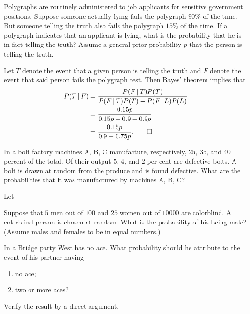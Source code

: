 \begin{problem}
   Polygraphs are routinely administered to job
  applicants for sensitive government positions. Suppose someone actually
  lying fails the polygraph \(90\%\) of the time. But someone telling the
  truth also fails the polygraph \(15\%\) of the time. If a polygraph
  indicates that an applicant is lying, what is the probability that he is
  in fact telling the truth? Assume a general prior probability \(p\) that
  the person is telling the truth.
\end{problem}
\begin{solution*}
  Let \(T\) denote the event that a given person is telling the truth and
  \(F\) denote the event that said person fails the polygraph test. Then
  Bayes' theorem implies that
  \begin{align*}
    P(T\,|\,F)
    &=\frac{P(F\,|\,T)P(T)}{P(F\,|\,T)P(T) + P(F\,|\,L)P(L)}\\
    &=\frac{0.15p}{0.15p + 0.9 - 0.9p}\\
    &=\frac{0.15p}{0.9-0.75p}.\qedhere
  \end{align*}
\end{solution*}

\begin{problem}[Handout 4, \# 8]
  In a bolt factory machines A, B, C manufacture, respectively, \(25\),
  \(35\), and \(40\) percent of the total. Of their output \(5\), \(4\),
  and \(2\) per cent are defective bolts. A bolt is drawn at random from
  the produce and is found defective. What are the probabilities that it
  was manufactured by machines A, B, C?
\end{problem}
\begin{solution*}
  Let
\end{solution*}

\begin{problem}[Handout 4, \# 9]
  Suppose that \(5\) men out of \(100\) and \(25\) women out of
  \(\num{10000}\) are colorblind. A colorblind person is chosen at
  random. What is the probability of his being male? (Assume males and
  females to be in equal numbers.)
\end{problem}
\begin{solution*}
\end{solution*}

\begin{problem}
  In a Bridge party West has no ace. What probability should he attribute
  to the event of his partner having
  \begin{enumerate}[label=(\alph*),noitemsep]
  \item no ace;
  \item two or more aces?
  \end{enumerate}
  Verify the result by a direct argument.
\end{problem}
\begin{solution*}
\end{solution*}

